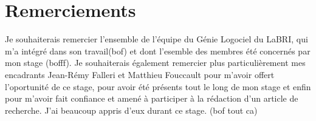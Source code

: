\section{Remerciements}
\label{sec:remerciements}

Je souhaiterais remercier l'ensemble de l'équipe du Génie Logociel du LaBRI, qui m'a intégré dans son travail(bof) et dont l'esemble des membres été concernés par mon stage (bofff).
Je souhaiterais également remercier plus particulièrement mes encadrants Jean-Rémy Falleri et Matthieu Fouccault pour m'avoir offert l'oportunité de ce stage, pour avoir été présents tout le long de mon stage et enfin pour m'avoir fait confiance et amené à participer à la rédaction d'un article de recherche. J'ai beaucoup appris d'eux durant ce stage.  (bof tout ca)


